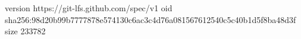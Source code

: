 version https://git-lfs.github.com/spec/v1
oid sha256:98d20b99b7777878e574130c6ac3c4d76a081567612540c5c40b1d5f8ba48d3f
size 233782
